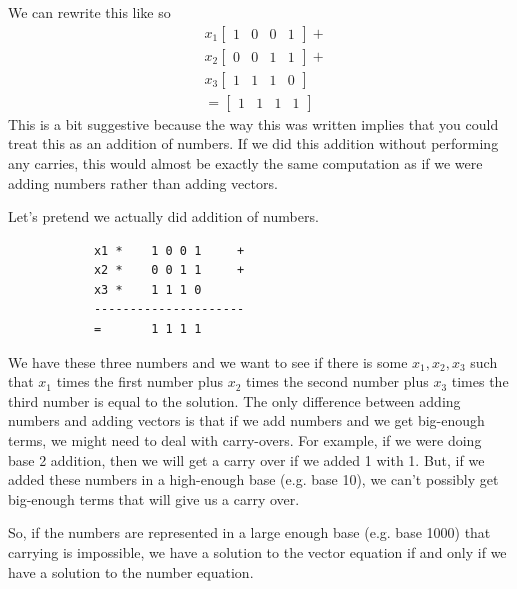 \documentclass[letterpaper]{article}
\begin{document}
We can rewrite this like so 
\begin{equation*}
    \begin{aligned}
        &x_1 \begin{bmatrix}
            1 & 0 & 0 & 1
        \end{bmatrix} + \\ 
        &x_2 \begin{bmatrix}
            0 & 0 & 1 & 1
        \end{bmatrix} + \\ 
        &x_3 \begin{bmatrix}
            1 & 1 & 1 & 0
        \end{bmatrix} \\ 
        &= \begin{bmatrix}
            1 & 1 & 1 & 1
        \end{bmatrix}
    \end{aligned}
\end{equation*}
This is a bit suggestive because the way this was written implies that you could treat this as an addition of numbers. If we did this addition without performing any carries, this would almost be exactly the same computation as if we were adding numbers rather than adding vectors.

\bigskip 

Let's pretend we actually did addition of numbers. 
\begin{verbatim}
            x1 *    1 0 0 1     +
            x2 *    0 0 1 1     + 
            x3 *    1 1 1 0
            ---------------------
            =       1 1 1 1
\end{verbatim}
We have these three numbers and we want to see if there is some $x_1, x_2, x_3$ such that $x_1$ times the first number plus $x_2$ times the second number plus $x_3$ times the third number is equal to the solution. The only difference between adding numbers and adding vectors is that if we add numbers and we get big-enough terms, we might need to deal with carry-overs. For example, if we were doing base 2 addition, then we will get a carry over if we added 1 with 1. But, if we added these numbers in a high-enough base (e.g. base 10), we can't possibly get big-enough terms that will give us a carry over.

\bigskip 

So, if the numbers are represented in a large enough base (e.g. base 1000) that carrying is impossible, we have a solution to the vector equation if and only if we have a solution to the number equation. 
\end{document}
